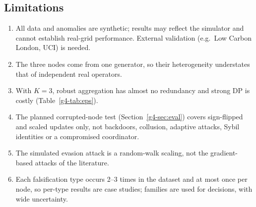 \subsection{Limitations}

\begin{enumerate}
  \item All data and anomalies are synthetic; results may reflect the simulator and cannot establish real-grid performance. External validation (e.g.\ Low Carbon London, UCI) is needed.
  \item The three nodes come from one generator, so their heterogeneity understates that of independent real operators.
  \item With $K=3$, robust aggregation has almost no redundancy and strong DP is costly (Table~\ref{g4-tab:eps}).
  \item The planned corrupted-node test (Section~\ref{g4-sec:eval}) covers sign-flipped and scaled updates only, not backdoors, collusion, adaptive attacks, Sybil identities or a compromised coordinator.
  \item The simulated evasion attack is a random-walk scaling, not the gradient-based attacks of the literature.
  \item Each falsification type occurs 2--3 times in the dataset and at most once per node, so per-type results are case studies; families are used for decisions, with wide uncertainty.
\end{enumerate}

